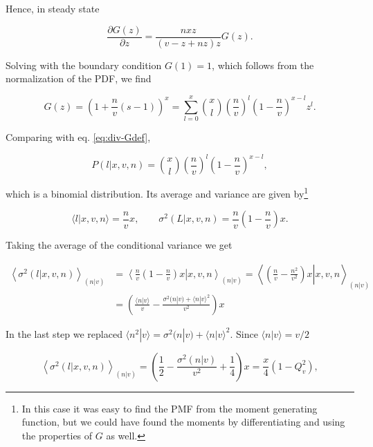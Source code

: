 Hence, in steady state

\begin{equation*}
  \frac{\partial G(z)}{\partial z} = \frac{nxz}{(v-z+nz)z}G(z).
\end{equation*}

Solving with the boundary condition $G(1) = 1$, which follows from the normalization of the PDF, we find

\begin{equation*}
  G(z) = \left(1+\frac{n}{v}\left(s-1\right)\right)^x = \sum_{l=0}^x {x\choose l}\left(\frac{n}{v}\right)^l\left(1-\frac{n}{v}\right)^{x-l}z^l.
\end{equation*}

Comparing with eq. \eqref{eq:div-Gdef},

\begin{equation*}
  P(l|x,v,n) = {x\choose l}\left(\frac{n}{v}\right)^l\left(1-\frac{n}{v}\right)^{x-l},
\end{equation*}

which is a binomial distribution. Its average and variance are given by\footnote{In this case it was easy to find the PMF from the moment generating function, but we could have found the moments by differentiating and using the properties of $G$ as well.}

\begin{equation*}
  \langle l|x,v,n\rangle = \frac{n}{v}x, \quad\quad \sigma^2(L|x,v,n) = \frac{n}{v}\left(1-\frac{n}{v}\right)x.
\end{equation*}

Taking the average of the conditional variance we get

\begin{equation*}
  \begin{split}
    \left\langle\sigma^2(l|x,v,n)\right\rangle_{(n|v)} &= \left\langle\left.\frac{n}{v}\left(1-\frac{n}{v}\right)x\right|x,v,n\right\rangle_{(n|v)} = \left\langle\left.\left(\frac{n}{v}-\frac{n^2}{v^2}\right)x\right|x,v,n\right\rangle_{(n|v)}\\
    &= \left(\frac{\langle n|v\rangle}{v}-\frac{\sigma^2(n|v) + \langle n|v\rangle^2}{v^2}\right)x
  \end{split}
\end{equation*}

In the last step we replaced $\langle n^2|v\rangle = \sigma^2(n|v) + \langle n|v\rangle^2$. Since $\langle n|v\rangle = v/2$

\begin{equation}
  \label{eq:div-varofavel}
  \left\langle\sigma^2(l|x,v,n)\right\rangle_{(n|v)} = \left(\frac{1}{2} - \frac{\sigma^2(n|v)}{v^2} + \frac{1}{4}\right)x = \frac{x}{4}\left(1-Q_v^2\right),
\end{equation}

